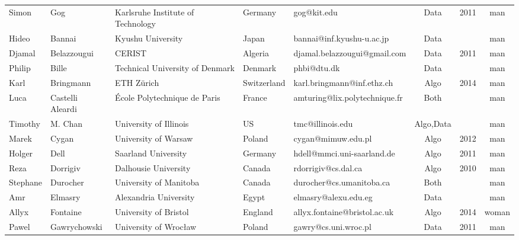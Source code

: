\documentclass[a4paper,10pt]{article}
\begin{document}
{\begin{tabular}{@{}l@{\hspace{0.215cm}}l@{\hspace{0.215cm}}l@{\hspace{0.215cm}}l@{\hspace{0.215cm}}l@{\hspace{0.215cm}}c@{\hspace{0.215cm}}c@{\hspace{0.215cm}}c@{}}
Simon        & Gog              & Karlsruhe Institute of Technology        & Germany     & gog@kit.edu                        & Data      & 2011     & man   \\
Hideo        & Bannai           & Kyushu University                        & Japan       & bannai@inf.kyushu-u.ac.jp          & Data      &          & man   \\
Djamal       & Belazzougui      & CERIST                                   & Algeria     & djamal.belazzougui@gmail.com       & Data      & 2011     & man   \\
Philip       & Bille            & Technical University of Denmark          & Denmark     & phbi@dtu.dk                        & Data      &          & man   \\
Karl         & Bringmann        & ETH Zürich                               & Switzerland & karl.bringmann@inf.ethz.ch         & Algo      & 2014     & man   \\
Luca         & Castelli Aleardi & \'Ecole Polytechnique de Paris           & France      & amturing@lix.polytechnique.fr      & Both &          & man   \\
Timothy      & M. Chan          & University of Illinois                   & US      & tmc@illinois.edu             & Algo,Data      &          & man   \\
Marek        & Cygan            & University of Warsaw                     & Poland      & cygan@mimuw.edu.pl                 & Algo      & 2012     & man   \\
Holger       & Dell             & Saarland University                      & Germany     & hdell@mmci.uni-saarland.de         & Algo      & 2011     & man   \\
Reza         & Dorrigiv         & Dalhousie University                     & Canada      & rdorrigiv@cs.dal.ca                & Algo      & 2010     & man   \\
Stephane     & Durocher         & University of Manitoba                   & Canada      & durocher@cs.umanitoba.ca           & Both &          & man   \\
  Amr        & Elmasry          & Alexandria University                    & Egypt       & elmasry@alexu.edu.eg               & Data      &          & man   \\
Allyx        & Fontaine         & University of Bristol                    & England     & allyx.fontaine@bristol.ac.uk       & Algo      & 2014     & woman \\
Pawel        & Gawrychowski     & University of Wrocław                    & Poland      & gawry@cs.uni.wroc.pl               & Data      & 2011     & man   \\

\end{tabular}}
\end{document}
